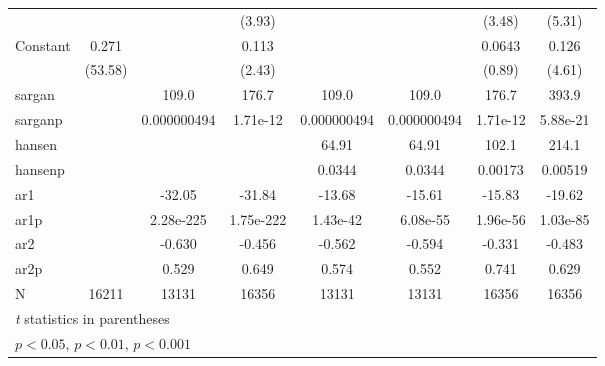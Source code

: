 \begin{table}[htbp]
\begin{tabular}{l*{7}{c}}
                    &                     &                     &      (3.93)         &                     &                     &      (3.48)         &      (5.31)         \\
\addlinespace
Constant            &       0.271\sym{***}&                     &       0.113\sym{*}  &                     &                     &      0.0643         &       0.126\sym{***}\\
                    &     (53.58)         &                     &      (2.43)         &                     &                     &      (0.89)         &      (4.61)         \\
\midrule
sargan              &                     &       109.0         &       176.7         &       109.0         &       109.0         &       176.7         &       393.9         \\
sarganp             &                     & 0.000000494         &    1.71e-12         & 0.000000494         & 0.000000494         &    1.71e-12         &    5.88e-21         \\
hansen              &                     &                     &                     &       64.91         &       64.91         &       102.1         &       214.1         \\
hansenp             &                     &                     &                     &      0.0344         &      0.0344         &     0.00173         &     0.00519         \\
ar1                 &                     &      -32.05         &      -31.84         &      -13.68         &      -15.61         &      -15.83         &      -19.62         \\
ar1p                &                     &   2.28e-225         &   1.75e-222         &    1.43e-42         &    6.08e-55         &    1.96e-56         &    1.03e-85         \\
ar2                 &                     &      -0.630         &      -0.456         &      -0.562         &      -0.594         &      -0.331         &      -0.483         \\
ar2p                &                     &       0.529         &       0.649         &       0.574         &       0.552         &       0.741         &       0.629         \\
N                   &       16211         &       13131         &       16356         &       13131         &       13131         &       16356         &       16356         \\
\bottomrule
\multicolumn{8}{l}{\footnotesize \textit{t} statistics in parentheses}\\
\multicolumn{8}{l}{\footnotesize \sym{*} \(p<0.05\), \sym{**} \(p<0.01\), \sym{***} \(p<0.001\)}\\
\end{tabular}
\end{table}
